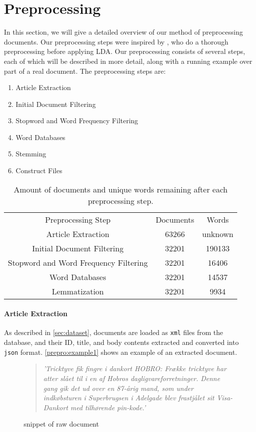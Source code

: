 \section{Preprocessing}\label{sec:prepro}

In this section, we will give a detailed overview of our method of preprocessing documents.
Our preprocessing steps were inspired by \cite{quanti}, who do a thorough preprocessing before applying LDA. 
Our preprocessing consists of several steps, each of which will be described in more detail, along with a running example over part of a real document.
The preprocessing steps are:
\begin{enumerate}[label=\alph*]
	\item Article Extraction
	\item Initial Document Filtering
	\item Stopword and Word Frequency Filtering
	\item Word Databases
	\item Stemming
	\item Construct Files
\end{enumerate}

\begin{table}
	\begin{tabular}{c|c|c}
		Preprocessing Step & Documents & Words\\
		Article Extraction & 63266 & unknown \\ 
		Initial Document Filtering & 32201 & 190133 \\ 
		Stopword and Word Frequency Filtering & 32201 & 16406 \\
		Word Databases & 32201 & 14537 \\
		Lemmatization & 32201 & 9934\\
	\end{tabular}
	\label{tab:prepro_doc_word}
	\caption{Amount of documents and unique words remaining after each preprocessing step.}
\end{table}

\paragraph{Article Extraction}
As described in \autoref{sec:dataset}, documents are loaded as \texttt{xml} files from the database, and their ID, title, and body contents extracted and converted into \texttt{json} format.
\autoref{prepro:example1} shows an example of an extracted document.
\begin{figure}[h]
	\begin{quote}
		\textit{
			'Tricktyve fik fingre i dankort HOBRO: Frække tricktyve har atter slået til i en af Hobros dagligvareforretninger. Denne gang gik det ud over en 87-årig mand, som under indkøbsturen i Superbrugsen i Adelgade blev frastjålet sit Visa-Dankort med tilhørende pin-kode.'
		}
	\end{quote}
	\caption{snippet of raw document}
	\label{prepro:example1}
\end{figure}

